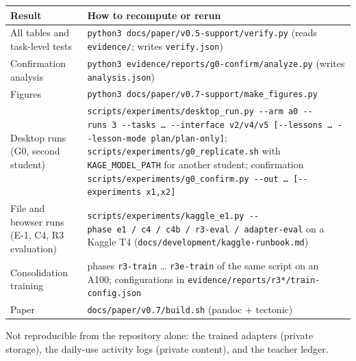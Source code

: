\documentclass[
  10pt,
]{article}
\newcounter{none} %
\begin{document}
{\def\LTcaptype{none} %
\begin{longtable}[]{@{}
  >{\raggedright\arraybackslash}p{}
  >{\raggedright\arraybackslash}p{}@{}}
\toprule\noalign{}
\begin{minipage}[b]{\linewidth}\raggedright
Result
\end{minipage} & \begin{minipage}[b]{\linewidth}\raggedright
How to recompute or rerun
\end{minipage} \\
\midrule\noalign{}
\endhead
\bottomrule\noalign{}
\endlastfoot
All tables and task-level tests &
\texttt{python3\ docs/paper/v0.5-support/verify.py} (reads
\texttt{evidence/}; writes \texttt{verify.json}) \\
Confirmation analysis &
\texttt{python3\ evidence/reports/g0-confirm/analyze.py} (writes
\texttt{analysis.json}) \\
Figures & \texttt{python3\ docs/paper/v0.7-support/make\_figures.py} \\
Desktop runs (G0, second student) &
\texttt{scripts/experiments/desktop\_run.py\ -\/-arm\ a0\ -\/-runs\ 3\ -\/-tasks\ …\ -\/-interface\ v2/v4/v5\ {[}-\/-lessons\ …\ -\/-lesson-mode\ plan/plan-only{]}};
\texttt{scripts/experiments/g0\_replicate.sh} with
\texttt{KAGE\_MODEL\_PATH} for another student; confirmation
\texttt{scripts/experiments/g0\_confirm.py\ -\/-out\ …\ {[}-\/-experiments\ x1,x2{]}} \\
File and browser runs (E-1, C4, R3 evaluation) &
\texttt{scripts/experiments/kaggle\_e1.py\ -\/-phase\ e1\ /\ c4\ /\ c4b\ /\ r3-eval\ /\ adapter-eval}
on a Kaggle T4 (\texttt{docs/development/kaggle-runbook.md}) \\
Consolidation training & phases \texttt{r3-train} \ldots{}
\texttt{r3e-train} of the same script on an A100; configurations in
\texttt{evidence/reports/r3*/train-config.json} \\
Paper & \texttt{docs/paper/v0.7/build.sh} (pandoc + tectonic) \\
\end{longtable}
}

Not reproducible from the repository alone: the trained adapters
(private storage), the daily-use activity logs (private content), and
the teacher ledger.
\end{document}
